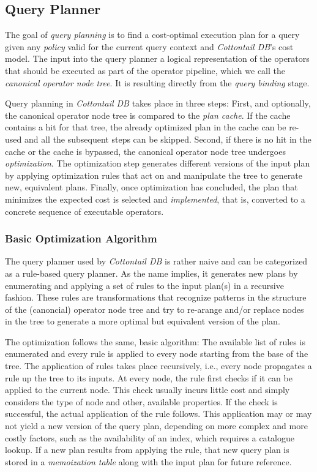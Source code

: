 \subsection{Query Planner}

The goal of \emph{query planning} is to find a cost-optimal execution plan for a query given any \emph{policy} valid for the current query context and \emph{Cottontail DB}'s cost model. The input into the query planner a logical representation of the operators that should be executed as part of the operator pipeline, which we call the \emph{canonical operator node tree}. It is resulting directly from the \emph{query binding} stage.

Query planning in \emph{Cottontail DB} takes place in three steps: First, and optionally, the canonical operator node tree is compared to the \emph{plan cache}. If the cache contains a hit for that tree, the already optimized plan in the cache can be re-used and all the subsequent steps can be skipped. Second, if there is no hit in the cache or the cache is bypassed, the canonical operator node tree undergoes \emph{optimization}. The optimization step generates different versions of the input plan by applying optimization rules that act on and manipulate the tree to generate new, equivalent plans. Finally, once optimization has concluded, the plan that minimizes the expected cost is selected and \emph{implemented}, that is, converted to a concrete sequence of executable operators.

\subsubsection{Basic Optimization Algorithm}

The query planner used by \emph{Cottontail DB} is rather naive and can be categorized as a rule-based query planner. As the name implies, it generates new plans by enumerating and applying a set of rules to the input plan(s) in a recursive fashion. These rules are transformations that recognize patterns in the structure of the (canoncial) operator node tree and try to re-arange and/or replace nodes in the tree to generate a more optimal but equivalent version of the plan.

The optimization follows the same, basic algorithm: The available list of rules is enumerated and every rule is applied to every node starting from the base of the tree. The application of rules takes place recursively, i.e., every node propagates a rule up the tree to its inputs. At every node, the rule first checks if it can be applied to the current node. This check usually incurs little cost and simply considers the type of node and other, available properties. If the check is successful, the actual application of the rule follows. This application may or may not yield a new version of the query plan, depending on more complex and more costly factors, such as the availability of an index, which requires a catalogue lookup. If a new plan results from applying the rule, that new query plan is stored in a \emph{memoization table} along with the input plan for future reference. 


